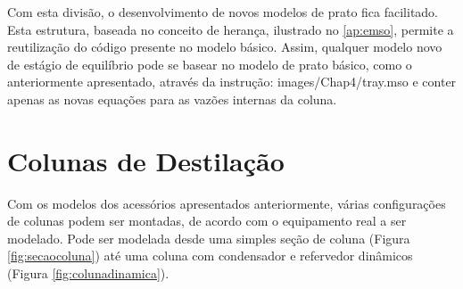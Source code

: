 Com esta divisão, o desenvolvimento de novos modelos de prato fica facilitado. Esta estrutura, baseada no conceito de
herança, ilustrado no \autoref{ap:emso}, permite a reutilização do código presente no modelo básico.
Assim, qualquer modelo novo de estágio de
equilíbrio pode se basear no modelo de prato básico, como o anteriormente apresentado, através da instrução:
\vspace{0.5cm}
 {images/Chap4/tray.mso}
e conter apenas as novas equações para as vazões internas da coluna.

\section{Colunas de Destilação} \label{sec:modelocolunas}
Com os modelos dos acessórios apresentados anteriormente, várias configurações de colunas podem ser montadas, de acordo
com o equipamento real a ser modelado. Pode ser modelada desde uma simples seção de coluna (Figura
\autoref{fig:secaocoluna}) até uma coluna com condensador e refervedor dinâmicos (Figura \autoref{fig:colunadinamica}).

